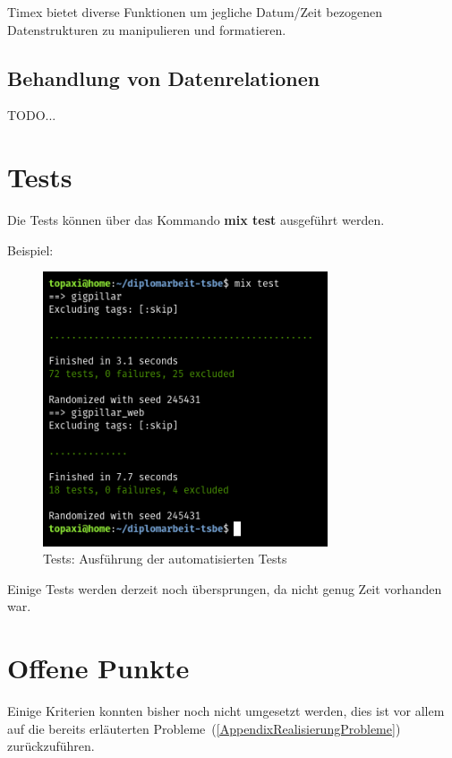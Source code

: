 Timex bietet diverse Funktionen um jegliche Datum/Zeit bezogenen Datenstrukturen
zu manipulieren und formatieren.

\subsection{Behandlung von Datenrelationen}

TODO...

\clearpage
\section{Tests}

Die Tests können über das Kommando \textbf{mix test} ausgeführt werden.

\noindent{}Beispiel:

\begin{figure}[!htb]
  \centering
  \includegraphics[width=0.75\textwidth]{realisierung/test-run.png}
  \caption{Tests: Ausführung der automatisierten Tests}
\end{figure}

\noindent{}Einige Tests werden derzeit noch übersprungen, da nicht genug Zeit vorhanden
war.



\clearpage
\section{Offene Punkte}

Einige Kriterien konnten bisher noch nicht umgesetzt werden, dies ist vor allem
auf die bereits erläuterten Probleme~(\ref{AppendixRealisierungProbleme})
zurückzuführen.

